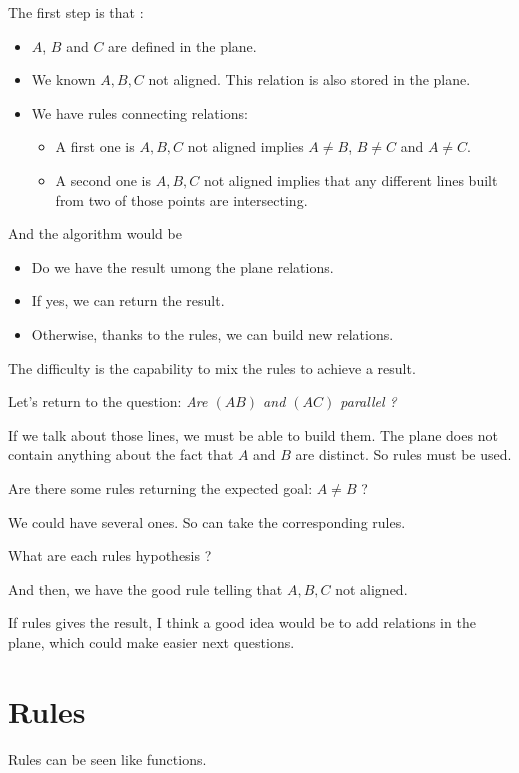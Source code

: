 \documentclass[a4paper]{article}
\begin{document}
The first step is that :
\begin{itemize}
\item $A$, $B$ and $C$ are defined in the plane.
\item We known $A, B, C$ not aligned. This relation is also stored in the plane.
\item We have rules connecting relations:
\begin{itemize}
\item A first one is $A,B,C$ not aligned implies $A\neq B$, $B\neq C$ and $A\neq C$.
\item A second one is $A,B,C$ not aligned implies that any different lines built from two of those points are intersecting.
\end{itemize}
\end{itemize}

And the algorithm would be
\begin{itemize}
\item Do we have the result umong the plane relations.
\item If yes, we can return the result.
\item Otherwise, thanks to the rules, we can build new relations.
\end{itemize}

The difficulty is the capability to mix the rules to achieve a result.

Let's return to the question: \textit{Are $(AB)$ and $(AC)$ parallel ?}

If we talk about those lines, we must be able to build them. The plane does not contain anything about the fact that $A$ and $B$ are distinct. So rules must be used.

Are there some rules returning the expected goal: $A\neq B$ ?

We could have several ones. So can take the corresponding rules.

What are each rules hypothesis ?

And then, we have the good rule telling that $A,B,C$ not aligned.

If rules gives the result, I think a good idea would be to add relations in the plane, which could make easier next questions.


\section{Rules}

Rules can be seen like functions.
\end{document}
